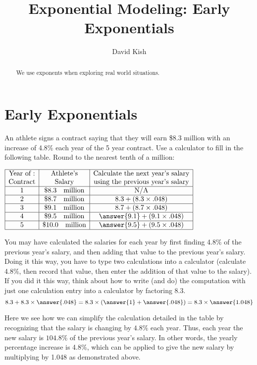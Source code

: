 \documentclass{ximera}
\author{David Kish}
\title{Exponential Modeling: Early Exponentials}
\begin{document}
\begin{abstract}
We use exponents when exploring real world situations.
\end{abstract}
\maketitle

 
\section{Early Exponentials}
\begin{example}
An athlete signs a contract saying that they will earn \$8.3 million with an increase of 4.8\% each year of the 5 year contract.
Use a calculator to fill in the following table.  Round to the nearest tenth of a million:\\
\begin{center}
$\begin{array}{|c|c|c|}
\hline
\text{Year of :} & \text{Athlete's} & \text{Calculate the next year's salary} \\
\text{Contract} & \text{Salary} & \text{using the previous year's salary}\\
\hline
1& \$8.3 \quad \text{million} & \text{N/A} \\
\hline
2 & \$ 8.7 \quad \text{million} & 8.3 + (8.3 \times {.048})\\
\hline
3 & \$ {9.1} \quad \text{million} & 8.7 + (8.7 \times {.048}) \\
\hline
4 & \$ {9.5} \quad \text{million} & \answer{9.1} + ({9.1} \times {.048}) \\
\hline
5 & \$ {10.0} \quad \text{million} & \answer{9.5} + ({9.5} \times {.048})\\
\hline
\end{array}$
\end{center}
You may have calculated the salaries for each year by first finding 4.8\% of the previous year's salary, and then adding that value to the previous year's salary.  Doing it this way, you have to type two calculations into a calculator (calculate 4.8\%, then record that value, then enter the addition of that value to the salary).  If you did it this way, think about how to write (and do) the computation with just one calculation entry into a calculator by factoring $8.3$.
$$
8.3 + 8.3 \times \answer{.048} = 8.3 \times (\answer{1} + \answer{.048}) = 8.3 \times \answer{1.048}
$$
\end{example}
%
Here we see how we can simplify the calculation detailed in the table by recognizing that the salary is changing by $4.8\%$ each year. Thus, each year the new salary is $104.8\%$ of the previous year's salary. In other words, the yearly percentage increase is 4.8\%, which can be applied to give the new salary by multiplying by 1.048 as demonstrated above. 
\end{document}
